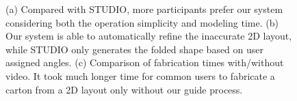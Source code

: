 \begin{figure}[h]
	\centering
	\vspace{2ex}
	\vspace{2ex}
	\caption{(a) Compared with STUDIO, more participants prefer our system considering both the operation simplicity and modeling time. (b) Our system is able to automatically refine the inaccurate 2D layout, while STUDIO only generates the folded shape based on user assigned angles. (c) Comparison of fabrication times with/without video. It took much longer time for common users to fabricate a carton from a 2D layout only without our guide process.}
	\label{fig:userstudy}
\end{figure}



